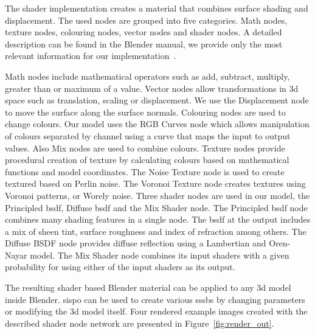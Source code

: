 The shader implementation creates a material that combines surface shading and displacement. The used nodes are grouped into five categories. Math nodes, texture nodes, colouring nodes, vector nodes and shader nodes. A detailed description can be found in the Blender manual, we provide only the most relevant information for our implementation~\cite{IntroductionManual}.

Math nodes include mathematical operators such as add, subtract, multiply, greater than or maximum of a value. Vector nodes allow transformations in \gls{3d} space such as translation, scaling or displacement. We use the Displacement node to move the surface along the surface normals. Colouring nodes are used to change colours. Our model uses the RGB Curves node which allows manipulation of colours separated by channel using a curve that maps the input to output values. Also Mix nodes are used to combine colours. Texture nodes provide procedural creation of texture by calculating colours based on mathematical functions and model coordinates. The Noise Texture node is used to create textured based on Perlin noise. The Voronoi Texture node creates textures using Voronoi patterns, or Worely noise. Three shader nodes are used in our model, the Principled \gls{bsdf}, Diffuse \gls{bsdf} and the Mix Shader node. The Principled \gls{bsdf} node combines many shading features in a single node. The \gls{bsdf} at the output includes a mix of sheen tint, surface roughness and index of refraction among others. The Diffuse BSDF node provides diffuse reflection using a Lambertian and Oren-Nayar model. The Mix Shader node combines its input shaders with a given probability for using either of the input shaders as its output.

The resulting shader based Blender material can be applied to any \gls{3d} model inside Blender. \Gls{sispo} can be used to create various \glspl{sssb} by changing parameters or modifying the \gls{3d} model itself. Four rendered example images created with the described shader node network are presented in Figure~\ref{fig:render_out}.

